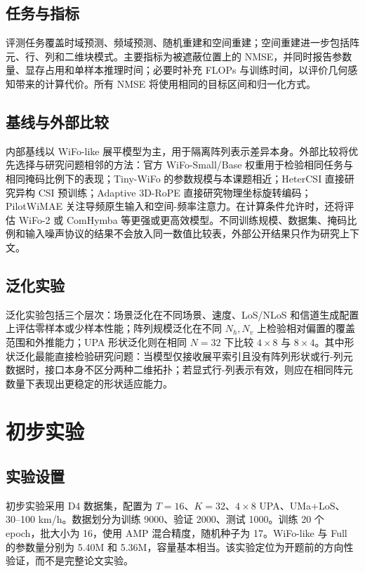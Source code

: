 \documentclass[journal]{IEEEtran}
\begin{document}
\subsection{任务与指标}

评测任务覆盖时域预测、频域预测、随机重建和空间重建；空间重建进一步包括阵元、行、列和二维块模式。主要指标为被遮蔽位置上的 NMSE，并同时报告参数量、显存占用和单样本推理时间；必要时补充 FLOPs 与训练时间，以评价几何感知带来的计算代价。所有 NMSE 将使用相同的目标区间和归一化方式。

\subsection{基线与外部比较}

内部基线以 WiFo-like 展平模型为主，用于隔离阵列表示差异本身。外部比较将优先选择与研究问题相邻的方法：官方 WiFo-Small/Base 权重用于检验相同任务与相同掩码比例下的表现；Tiny-WiFo 的参数规模与本课题相近；HeterCSI 直接研究异构 CSI 预训练；Adaptive 3D-RoPE 直接研究物理坐标旋转编码；PilotWiMAE 关注导频原生输入和空间-频率注意力。在计算条件允许时，还将评估 WiFo-2 或 ComHymba 等更强或更高效模型。不同训练规模、数据集、掩码比例和输入噪声协议的结果不会放入同一数值比较表，外部公开结果只作为研究上下文。

\subsection{泛化实验}

泛化实验包括三个层次：场景泛化在不同场景、速度、LoS/NLoS 和信道生成配置上评估零样本或少样本性能；阵列规模泛化在不同 \(N_h,N_v\) 上检验相对偏置的覆盖范围和外推能力；UPA 形状泛化则在相同 \(N=32\) 下比较 \(4\times8\) 与 \(8\times4\)。其中形状泛化最能直接检验研究问题：当模型仅接收展平索引且没有阵列形状或行-列元数据时，接口本身不区分两种二维拓扑；若显式行-列表示有效，则应在相同阵元数量下表现出更稳定的形状适应能力。

\section{初步实验}

\subsection{实验设置}

初步实验采用 D4 数据集，配置为 \(T=16\)、\(K=32\)、\(4\times8\) UPA、UMa+LoS、30--100 km/h。数据划分为训练 9000、验证 2000、测试 1000。训练 20 个 epoch，批大小为 16，使用 AMP 混合精度，随机种子为 17。WiFo-like 与 Full 的参数量分别为 5.40M 和 5.36M，容量基本相当。该实验定位为开题前的方向性验证，而不是完整论文实验。
\end{document}
